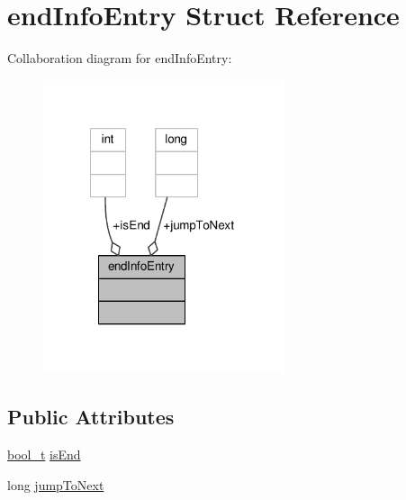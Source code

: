 \hypertarget{structendInfoEntry}{\section{end\-Info\-Entry Struct Reference}
\label{structendInfoEntry}
}


Collaboration diagram for end\-Info\-Entry\-:
\nopagebreak
\begin{figure}[H]
\begin{center}
\leavevmode
\includegraphics[width=200pt]{structendInfoEntry__coll__graph}
\end{center}
\end{figure}
\subsection*{Public Attributes}
\begin{DoxyCompactItemize}
\item 
\hyperlink{portable__defns_8h_a812d16e5494522586b3784e55d479912}{bool\-\_\-t} \hyperlink{structendInfoEntry_a593a387d50c0d6d484fbee4e1cc60f1f}{is\-End}
\item 
long \hyperlink{structendInfoEntry_a343f8955761cbdc1be01e9c787d75d72}{jump\-To\-Next}
\end{DoxyCompactItemize}


